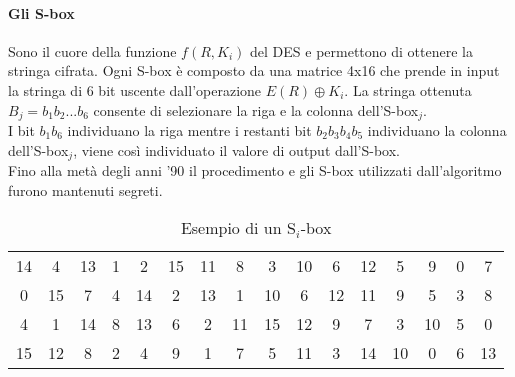 \documentclass[11pt, a4paper, oneside]{Thesis} %
\begin{document}
\paragraph{Gli S-box}Sono il cuore della funzione $f(R, K_i)$ del DES e permettono di ottenere la stringa cifrata.
Ogni S-box è composto da una matrice 4x16 che prende in input la stringa di 6 bit uscente dall'operazione $E(R) \oplus K_i$.
La stringa ottenuta $B_j=b_1b_2...b_6$ consente di selezionare la riga e la colonna dell'S-box$_j$. 
\\I bit $b_1 b_6$ individuano la riga mentre i restanti bit $b_2 b_3 b_4 b_5$ individuano la colonna dell'S-box$_j$, viene così individuato il valore di output dall'S-box.
\\Fino alla metà degli anni '90 il procedimento e gli S-box utilizzati dall'algoritmo furono mantenuti segreti.

  \begin{table}[ht] 
  \caption{Esempio di un S$_i$-box} %
  \centering %
  \begin{tabular}{c c c c c c c c c c c c c c c c} %
  \hline %
  14 & 4 & 13 & 1 & 2 & 15 & 11 & 8 & 3 & 10 & 6 & 12 & 5 & 9 & 0 & 7\\
  0 & 15 & 7 & 4 & 14 & 2 & 13 & 1 & 10 & 6 & 12 & 11 & 9 & 5 & 3 & 8\\
  4 & 1 & 14 & 8 & 13 & 6 & 2 & 11 & 15 & 12 & 9 & 7 & 3 & 10 & 5 & 0\\
  15 & 12 & 8 & 2 & 4 & 9 & 1 & 7 & 5 & 11 & 3 & 14 & 10 & 0 & 6 & 13\\
  \hline %
  \end{tabular} 
  \label{table:s_box} %
  \end{table}
\end{document}

